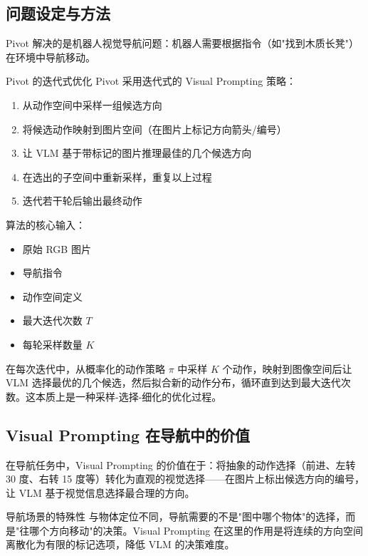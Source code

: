 \documentclass[a4paper]{article}
\begin{document}
\subsection{问题设定与方法}

Pivot 解决的是机器人视觉导航问题：机器人需要根据指令（如"找到木质长凳"）在环境中导航移动。

\begin{importantbox}{Pivot 的迭代式优化}
Pivot 采用迭代式的 Visual Prompting 策略：
\begin{enumerate}
    \item 从动作空间中采样一组候选方向
    \item 将候选动作映射到图片空间（在图片上标记方向箭头/编号）
    \item 让 VLM 基于带标记的图片推理最佳的几个候选方向
    \item 在选出的子空间中重新采样，重复以上过程
    \item 迭代若干轮后输出最终动作
\end{enumerate}
\end{importantbox}

算法的核心输入：
\begin{itemize}
    \item 原始 RGB 图片
    \item 导航指令
    \item 动作空间定义
    \item 最大迭代次数 $T$
    \item 每轮采样数量 $K$
\end{itemize}

在每次迭代中，从概率化的动作策略 $\pi$ 中采样 $K$ 个动作，映射到图像空间后让 VLM 选择最优的几个候选，然后拟合新的动作分布，循环直到达到最大迭代次数。这本质上是一种采样-选择-细化的优化过程。

\subsection{Visual Prompting 在导航中的价值}

在导航任务中，Visual Prompting 的价值在于：将抽象的动作选择（前进、左转 30 度、右转 15 度等）转化为直观的视觉选择——在图片上标出候选方向的编号，让 VLM 基于视觉信息选择最合理的方向。

\begin{warningbox}{导航场景的特殊性}
与物体定位不同，导航需要的不是"图中哪个物体"的选择，而是"往哪个方向移动"的决策。Visual Prompting 在这里的作用是将连续的方向空间离散化为有限的标记选项，降低 VLM 的决策难度。
\end{warningbox}
\end{document}
